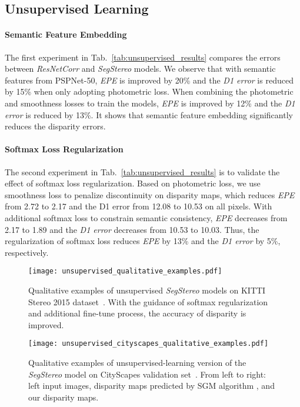 \documentclass[runningheads]{llncs}
\begin{document}
\subsection{Unsupervised Learning}\label{subsec:exp_unsup}

\paragraph{\textbf{Semantic Feature Embedding}} The first experiment in Tab.~\ref{tab:unsupervised_results} compares the errors between \emph{ResNetCorr} and \emph{SegStereo} models. We observe that with semantic features from PSPNet-50, \emph{EPE} is improved by 20\% and the \emph{D1 error} is reduced by 15\% when only adopting photometric loss. When combining the photometric and smoothness losses to train the models, \emph{EPE} is improved by 12\% and the \emph{D1 error} is reduced by 13\%. It shows that semantic feature embedding significantly reduces the disparity errors.

\paragraph{\textbf{Softmax Loss Regularization}} The second experiment in Tab.~\ref{tab:unsupervised_results} is to validate the effect of softmax loss regularization. Based on photometric loss, we use smoothness loss to penalize discontinuity on disparity maps, which reduces \emph{EPE} from 2.72 to 2.17 and the D1 error from 12.08 to 10.53 on all pixels. With additional softmax loss to constrain semantic consistency, \emph{EPE} decreases from 2.17 to 1.89 and the \emph{D1 error} decreases from 10.53 to 10.03. Thus, the regularization of softmax loss reduces \emph{EPE} by 13\% and the \emph{D1 error} by 5\%, respectively. 

\begin{figure}[!t]
  \centering
  \texttt{[image: unsupervised\_qualitative\_examples.pdf]}
  \caption{Qualitative examples of unsupervised \emph{SegStereo} models on KITTI Stereo 2015 dataset~\cite{Menze2015CVPR}. With the guidance of softmax regularization and additional fine-tune process, the accuracy of disparity is improved.}
  \label{fig:unsupervised_qualitative_results}   
\end{figure}

\begin{figure}[!t]
  \centering
  \texttt{[image: unsupervised\_cityscapes\_qualitative\_examples.pdf]}
  \caption{Qualitative examples of unsupervised-learning version of the \emph{SegStereo} model on CityScapes validation set~\cite{cordts2016cityscapes}. From left to right: left input images, disparity maps predicted by SGM algorithm \cite{hirschmuller2008stereo}, and our disparity maps.}
  \label{fig:unsupervised_cityscapes_examples}
\end{figure}
\end{document}
